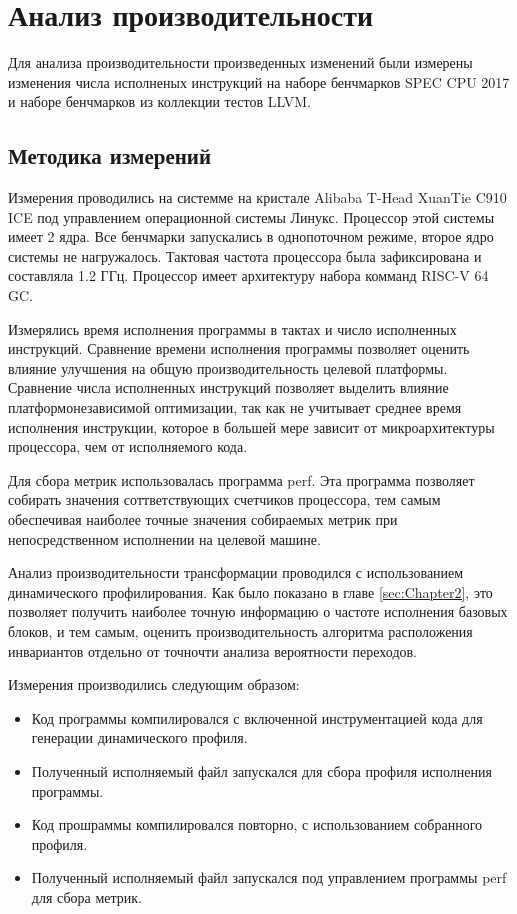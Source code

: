 \section{Анализ производительности}

Для анализа производительности произведенных изменений были измерены изменения числа исполненых инструкций на наборе бенчмарков SPEC CPU\textsuperscript{\tiny\textregistered} 2017 и наборе бенчмарков из коллекции тестов LLVM.

\subsection{Методика измерений}

Измерения проводились на системме на кристале Alibaba T-Head XuanTie C910 ICE под управлением операционной системы Линукс.
Процессор этой системы имеет 2 ядра.
Все бенчмарки запускались в однопоточном режиме, второе ядро системы не нагружалось.
Тактовая частота процессора была зафиксирована и составляла 1.2 ГГц.
Процессор имеет архитектуру набора комманд RISC-V 64 GC.

Измерялись время исполнения программы в тактах и число исполненных инструкций.
Сравнение времени исполнения программы позволяет оценить влияние улучшения на общую производительность целевой платформы.
Сравнение числа исполненных инструкций позволяет выделить влияние платформонезависимой оптимизации, так как не учитывает среднее время исполнения инструкции, которое в большей мере зависит от микроархитектуры процессора, чем от исполняемого кода.

Для сбора метрик использовалась программа perf.
Эта программа позволяет собирать значения соттветствующих счетчиков процессора, тем самым обеспечивая наиболее точные значения собираемых метрик при непосредственном исполнении на целевой машине.

Анализ производительности трансформации проводился с использованием динамического профилирования.
Как было показано в главе \ref{sec:Chapter2}, это позволяет получить наиболее точную информацию о частоте исполнения базовых блоков, и тем самым, оценить производительность алгоритма расположения инвариантов отдельно от точночти анализа вероятности переходов.

Измерения производились следующим образом:
\begin{itemize}
    \item Код программы компилировался с включенной инструментацией кода для генерации динамического профиля.
    \item Полученный исполняемый файл запускался для сбора профиля исполнения программы.
    \item Код прошраммы компилировался повторно, с использованием собранного профиля.
    \item Полученный исполняемый файл запускался под управлением программы perf для сбора метрик.
\end{itemize}

